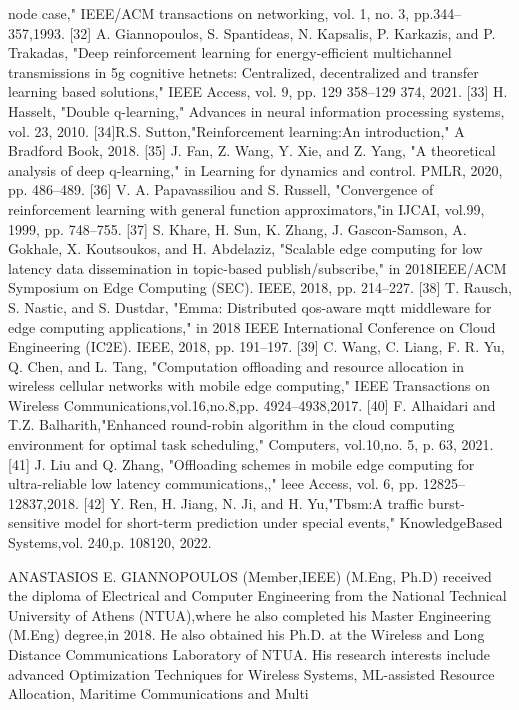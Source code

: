 \documentclass{article}
\begin{document}
node case," IEEE/ACM transactions on networking, vol. 1, no. 3, pp.344–357,1993.
[32] A. Giannopoulos, S. Spantideas, N. Kapsalis, P. Karkazis, and P. Trakadas, "Deep reinforcement learning for energy-efficient multichannel transmissions in 5g cognitive hetnets: Centralized, decentralized and transfer learning based solutions," IEEE Access, vol. 9, pp.
129 358–129 374, 2021.
[33] H. Hasselt, "Double q-learning," Advances in neural information processing systems, vol. 23, 2010.
[34]R.S. Sutton,"Reinforcement learning:An introduction," A Bradford Book, 2018.
[35] J. Fan, Z. Wang, Y. Xie, and Z. Yang, "A theoretical analysis of deep q-learning," in Learning for dynamics and control. PMLR, 2020, pp.
486–489.
[36] V. A. Papavassiliou and S. Russell, "Convergence of reinforcement learning with general function approximators,"in IJCAI, vol.99, 1999,
pp. 748–755.
[37] S. Khare, H. Sun, K. Zhang, J. Gascon-Samson, A. Gokhale, X. Koutsoukos, and H. Abdelaziz, "Scalable edge computing for low latency data dissemination in topic-based publish/subscribe," in 2018IEEE/ACM Symposium on Edge Computing (SEC). IEEE, 2018, pp.
214–227.
[38] T. Rausch, S. Nastic, and S. Dustdar, "Emma: Distributed qos-aware mqtt middleware for edge computing applications," in 2018 IEEE International Conference on Cloud Engineering (IC2E). IEEE, 2018,
pp. 191–197.
[39] C. Wang, C. Liang, F. R. Yu, Q. Chen, and L. Tang, "Computation offloading and resource allocation in wireless cellular networks with mobile edge computing," IEEE Transactions on Wireless Communications,vol.16,no.8,pp. 4924–4938,2017.
[40] F. Alhaidari and T.Z. Balharith,"Enhanced round-robin algorithm in the cloud computing environment for optimal task scheduling,"
Computers, vol.10,no. 5, p. 63, 2021.
[41] J. Liu and Q. Zhang, "Offloading schemes in mobile edge computing for ultra-reliable low latency communications,," leee Access, vol. 6, pp.
12825–12837,2018.
[42] Y. Ren, H. Jiang, N. Ji, and H. Yu,"Tbsm:A traffic burst-sensitive model for short-term prediction under special events," KnowledgeBased Systems,vol. 240,p. 108120, 2022.

ANASTASIOS E. GIANNOPOULOS (Member,IEEE) (M.Eng, Ph.D) received the diploma of Electrical and Computer Engineering from the National Technical University of Athens (NTUA),where he also completed his Master Engineering (M.Eng) degree,in 2018. He also obtained his Ph.D. at the Wireless and Long Distance Communications Laboratory of NTUA. His research interests include advanced Optimization Techniques for Wireless Systems, ML-assisted Resource Allocation, Maritime Communications and Multi
\end{document}

